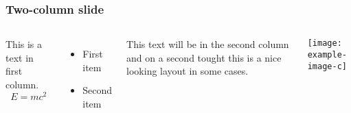 \begin{frame}
    \frametitle{Two-column slide}
    
    \begin{columns}
    
    This is a text in first column.
    $$E=mc^2$$
    \begin{itemize}
    \item First item
    \item Second item
    \end{itemize}
    
    This text will be in the second column
    and on a second tought this is a nice looking
    layout in some cases.
    \vspace{5mm}

    \texttt{[image: example-image-c]}
    \end{columns}
\end{frame}